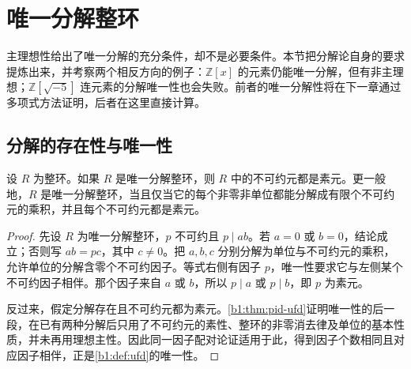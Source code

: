 
\section{唯一分解整环}
\label{b1:sec:1104}

%
%
%

主理想性给出了唯一分解的充分条件，却不是必要条件。本节把分解论自身的要求提炼出来，并考察两个相反方向的例子：\(\mathbb Z[x]\) 的元素仍能唯一分解，但有非主理想；\(\mathbb Z[\sqrt{-5}]\) 连元素的分解唯一性也会失败。前者的唯一分解性将在下一章通过多项式方法证明，后者在这里直接计算。

\subsection{分解的存在性与唯一性}
\label{b1:subsec:1104:01}

\begin{proposition}\label{b1:prop:ufd-prime}
	设 \(R\) 为整环。如果 \(R\) 是唯一分解整环，则 \(R\) 中的不可约元都是素元。更一般地，\(R\) 是唯一分解整环，当且仅当它的每个非零非单位都能分解成有限个不可约元的乘积，并且每个不可约元都是素元。
\end{proposition}
\begin{proof}
	先设 \(R\) 为唯一分解整环，\(p\) 不可约且 \(p\mid ab\)。若 \(a=0\) 或 \(b=0\)，结论成立；否则写 \(ab=pc\)，其中 \(c\ne0\)。把 \(a,b,c\) 分别分解为单位与不可约元的乘积，允许单位的分解含零个不可约因子。等式右侧有因子 \(p\)，唯一性要求它与左侧某个不可约因子相伴。那个因子来自 \(a\) 或 \(b\)，所以 \(p\mid a\) 或 \(p\mid b\)，即 \(p\) 为素元。

	反过来，假定分解存在且不可约元都为素元。\cref{b1:thm:pid-ufd}证明唯一性的后一段，在已有两种分解后只用了不可约元的素性、整环的非零消去律及单位的基本性质，并未再用理想主性。因此同一因子配对论证适用于此，得到因子个数相同且对应因子相伴，正是\cref{b1:def:ufd}的唯一性。
\end{proof}

